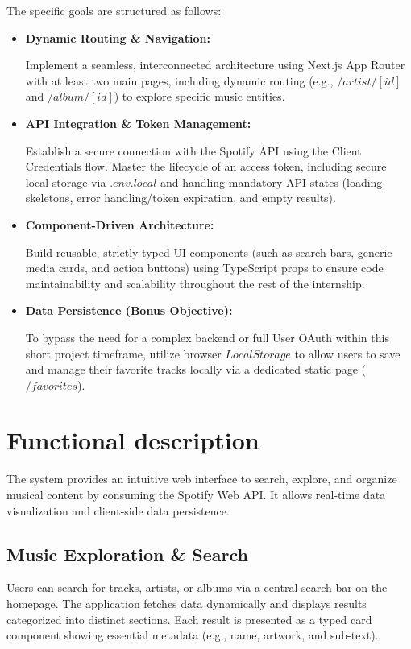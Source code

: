\documentclass{article}
\begin{document}
The specific goals are structured as follows:
\begin{itemize}
    \item \textbf{Dynamic Routing \& Navigation:}
    
    Implement a seamless, interconnected architecture using Next.js App Router with at least two main pages, including dynamic routing (e.g., $/artist/[id]$ and $/album/[id]$) to explore specific music entities.

    \item \textbf{API Integration \& Token Management:}

    Establish a secure connection with the Spotify API using the Client Credentials flow. Master the lifecycle of an access token, including secure local storage via $.env.local$ and handling mandatory API states (loading skeletons, error handling/token expiration, and empty results).

    \item \textbf{Component-Driven Architecture:}

    Build reusable, strictly-typed UI components (such as search bars, generic media cards, and action buttons) using TypeScript props to ensure code maintainability and scalability throughout the rest of the internship.

    \item \textbf{Data Persistence (Bonus Objective):}

    To bypass the need for a complex backend or full User OAuth within this short project timeframe, utilize browser $LocalStorage$ to allow users to save and manage their favorite tracks locally via a dedicated static page ($/favorites$).
\end{itemize}





\section{Functional description}
The system provides an intuitive web interface to search, explore, and organize musical content by consuming the Spotify Web API. It allows real-time data visualization and client-side data persistence.



\subsection{Music Exploration \& Search}
Users can search for tracks, artists, or albums via a central search bar on the homepage. The application fetches data dynamically and displays results categorized into distinct sections. Each result is presented as a typed card component showing essential metadata (e.g., name, artwork, and sub-text).
\end{document}
